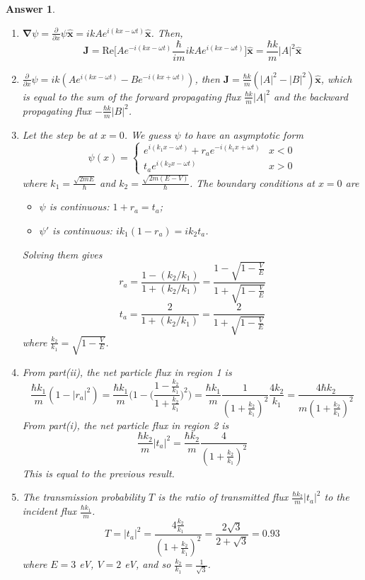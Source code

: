 \documentclass[a4paper]{article}
\newtheorem{ans}{Answer}[subsection]
\theoremstyle{new}
\begin{document}
\begin{ans}\leavevmode
\begin{enumerate}[label=(\roman*)]
\item $\boldsymbol{\nabla}\psi=\frac{\partial}{\partial x}\psi\mathbf{\hat{x}}=ik Ae^{i(kx-\omega t)}\mathbf{\hat{x}}$. Then,
$$\mathbf{J}=\text{Re}\bigg[Ae^{-i(kx-\omega t)}\frac{\hbar}{im}ikAe^{i(kx-\omega t)}\bigg]\mathbf{\hat{x}}=\frac{\hbar k}{m}|A|^2\mathbf{\hat{x}}$$
\item $\frac{\partial}{\partial x}\psi=ik(Ae^{i(kx-\omega t)}-Be^{-i(kx+\omega t)})$, then $\mathbf{J}=\frac{\hbar k}{m}(|A|^2-|B|^2)\mathbf{\hat{x}}$, which is equal to the sum of the forward propagating flux $\frac{\hbar k}{m}|A|^2$ and the backward propagating flux $-\frac{\hbar k}{m}|B|^2$.
\item Let the step be at $x=0$. We guess $\psi$ to have an asymptotic form
$$\psi(x)=
\left\{
        \begin{array}{ll}
      e^{i(k_1x-\omega t)}+r_ae^{-i(k_1x+\omega t)} & x<0\\
      t_a e^{i(k_2x-\omega t)} & x>0
        \end{array}
    \right.$$ 
where $k_1=\frac{\sqrt{2mE}}{\hbar}$ and $k_2=\frac{\sqrt{2m(E-V)}}{\hbar}$. The boundary conditions at $x=0$ are
\begin{itemize}
    \item $\psi$ is continuous: $1+r_a=t_a$;
    \item $\psi'$ is continuous: $ik_1(1-r_a)=ik_2t_a$.
\end{itemize}
Solving them gives $$r_a=\frac{1-(k_2/k_1)}{1+(k_2/k_1)}=\frac{1-\sqrt{1-\frac{V}{E}}}{1+\sqrt{1-\frac{V}{E}}}$$
$$t_a=\frac{2}{1+(k_2/k_1)}=\frac{2}{1+\sqrt{1-\frac{V}{E}}}$$
where $\frac{k_2}{k_1}=\sqrt{1-\frac{V}{E}}$.
\item From part(ii), the net particle flux in region 1 is 
$$\frac{\hbar k_1}{m}(1-|r_a|^2)=\frac{\hbar k_1}{m}\bigg(1-\bigg(\frac{1-\frac{k_2}{k_1}}{1+\frac{k_2}{k_1}}\bigg)^2\bigg)=\frac{\hbar k_1}{m}\frac{1}{(1+\frac{k_2}{k_1})^2}\frac{4k_2}{k_1}=\frac{4\hbar k_2}{m(1+\frac{k_2}{k_1})^2}$$
From part(i), the net particle flux in region 2 is
$$\frac{\hbar k_2}{m}|t_a|^2=\frac{\hbar k_2}{m}\frac{4}{(1+\frac{k_2}{k_1})^2}$$
This is equal to the previous result.
\item The transmission probability $T$ is the ratio of transmitted flux $\frac{\hbar k_2}{m}|t_a|^2$ to the incident flux $\frac{\hbar k_1}{m}$.
$$T=|t_a|^2=\frac{4\frac{k_2}{k_1}}{(1+\frac{k_2}{k_1})^2}=\frac{2\sqrt{3}}{2+\sqrt{3}}=0.93$$
where $E=3$ eV, $V=2$ eV, and so $\frac{k_2}{k_1}=\frac{1}{\sqrt{3}}$.
\end{enumerate}
\end{ans}
\end{document}
